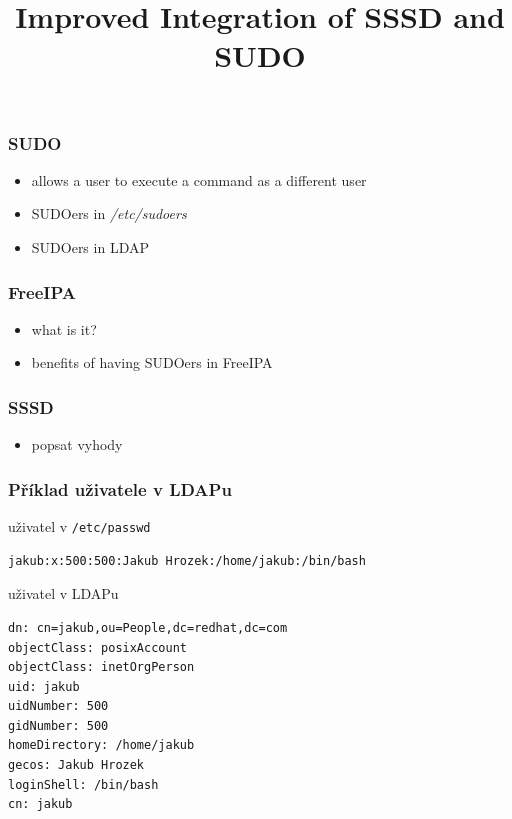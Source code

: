 \documentclass[pdftex,unicode,xcolor=table]{beamer}
\title{Improved Integration of SSSD and SUDO}
\institute{Michal Šrubař}
\date{}
\begin{document}
 {
    \maketitle
    \newpage
}


 {
    \begin{rhbg}
    \begin{frame}
        \titlepage
    \end{frame}
    \end{rhbg}
}

\begin{frame}
    \frametitle{SUDO}
    \begin{itemize}
        \item allows a user to execute a command as a different user
        \item SUDOers in \textit{/etc/sudoers}
        \item SUDOers in LDAP
    \end{itemize}
\end{frame}

\begin{frame}
    \frametitle{FreeIPA}
    \begin{itemize}
        \item what is it?
        \item benefits of having SUDOers in FreeIPA
    \end{itemize}
\end{frame}

\begin{frame}
    \frametitle{SSSD}
    \begin{itemize}
        \item popsat vyhody
    \end{itemize}
\end{frame}

\begin{frame}[fragile]
    \frametitle{Příklad uživatele v LDAPu}
        \begin{exampleblock}{uživatel v \texttt{/etc/passwd}}
\begin{verbatim}
jakub:x:500:500:Jakub Hrozek:/home/jakub:/bin/bash
\end{verbatim}
        \end{exampleblock}
        \begin{exampleblock}{uživatel v LDAPu}
\begin{verbatim}
dn: cn=jakub,ou=People,dc=redhat,dc=com
objectClass: posixAccount
objectClass: inetOrgPerson
uid: jakub
uidNumber: 500
gidNumber: 500
homeDirectory: /home/jakub
gecos: Jakub Hrozek
loginShell: /bin/bash
cn: jakub
\end{verbatim}
        \end{exampleblock}
\end{frame}
\end{document}
